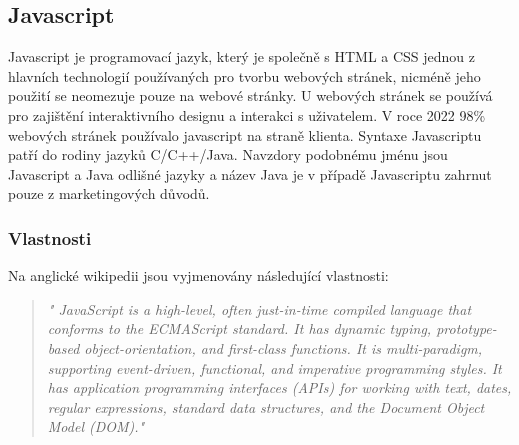 \documentclass[main.tex]{subfiles}
\begin{document}
\subsection{Javascript}
\label{javascript}
Javascript je programovací jazyk, který je společně s HTML a CSS jednou z hlavních technologií používaných pro tvorbu webových stránek, nicméně jeho použití se neomezuje pouze na webové stránky. U webových stránek se používá pro zajištění interaktivního designu a interakci s uživatelem. V roce 2022 98\% webových stránek používalo javascript na straně klienta. Syntaxe Javascriptu patří do rodiny jazyků C/C++/Java. Navzdory podobnému jménu jsou Javascript a Java odlišné jazyky a název Java je v případě Javascriptu zahrnut pouze z marketingových důvodů.


\subsubsection{Vlastnosti}
Na anglické wikipedii jsou vyjmenovány následující vlastnosti:
\begin{quote} \textit{" JavaScript is a high-level, often just-in-time compiled language that conforms to the ECMAScript standard. It has dynamic typing, prototype-based object-orientation, and first-class functions. It is multi-paradigm, supporting event-driven, functional, and imperative programming styles. It has application programming interfaces (APIs) for working with text, dates, regular expressions, standard data structures, and the Document Object Model (DOM)." \cite{web:wik:en:js}} \end{quote} 
\end{document}
